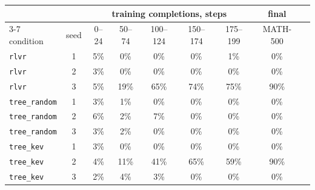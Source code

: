 \begin{tabular}{@{}lcccccccc@{}}
\toprule
 & & \multicolumn{5}{c}{training completions, steps} & final \\ \cmidrule(lr){3-7}
condition & seed & 0--24 & 50--74 & 100--124 & 150--174 & 175--199 & MATH-500 \\ \midrule
\texttt{rlvr} & 1 & 5\% & 0\% & 0\% & 0\% & 1\% & 0\% \\
\texttt{rlvr} & 2 & 3\% & 0\% & 0\% & 0\% & 0\% & 0\% \\
\texttt{rlvr} & 3 & 5\% & 19\% & 65\% & 74\% & 75\% & 90\% \\
\texttt{tree\_random} & 1 & 3\% & 1\% & 0\% & 0\% & 0\% & 0\% \\
\texttt{tree\_random} & 2 & 6\% & 2\% & 7\% & 0\% & 0\% & 0\% \\
\texttt{tree\_random} & 3 & 3\% & 2\% & 0\% & 0\% & 0\% & 0\% \\
\texttt{tree\_kev} & 1 & 3\% & 0\% & 0\% & 0\% & 0\% & 0\% \\
\texttt{tree\_kev} & 2 & 4\% & 11\% & 41\% & 65\% & 59\% & 90\% \\
\texttt{tree\_kev} & 3 & 2\% & 4\% & 3\% & 0\% & 0\% & 0\% \\
\bottomrule
\end{tabular}
